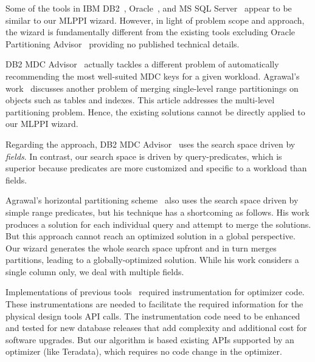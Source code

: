 \documentclass[runningheads]{comsis2}
\begin{document}
Some of the tools in IBM DB2~\cite{Lightstone04:db2auto}, 
Oracle~\cite{sheet2009oracle}, and MS SQL Server~\cite{agrawal04:integrating} 
appear to be similar to our MLPPI wizard. 
However, in light of problem scope and approach, the wizard 
is fundamentally different from the existing tools excluding Oracle Partitioning \hbox{Advisor}~\cite{sheet2009oracle} 
providing no published technical details. 

DB2 MDC Advisor~\cite{Lightstone04:db2auto} actually tackles 
a different problem of automatically recommending the most well-suited MDC 
keys for a given workload. 
Agrawal's work~\cite{agrawal04:integrating} 
discusses another problem of merging \hbox{single-level} range partitionings on objects such as tables and indexes. 
This article addresses the multi-level \hbox{partitioning} problem. 
Hence, the existing solutions cannot be directly applied to our MLPPI wizard.   

Regarding the approach, DB2 MDC Advisor~\cite{Lightstone04:db2auto} uses 
the search space driven by {\em fields}. In contrast, our search 
space is driven by query-predicates, which is superior because 
predicates are more customized and specific to a workload than fields. 

Agrawal's horizontal partitioning scheme~\cite{agrawal04:integrating} 
also uses the search space driven by simple range predicates, but 
his technique has a shortcoming as follows. 
His work produces a solution for each individual query and attempt 
to merge the solutions. But this approach cannot reach 
an optimized solution in a global perspective.
Our wizard generates the whole search space upfront and in turn merges partitions, leading to a \hbox{globally-optimized} solution. 
While his work considers a single column only, we deal with multiple fields.

Implementations of previous tools~\cite{agrawal04:integrating,Lightstone04:db2auto,nehme2011automated} \hbox{required} instrumentation for optimizer code.
These instrumentations are needed to facilitate the required 
information for the physical design tools API calls. 
The \hbox{instrumentation} code need to be enhanced and tested for new database 
releases that add complexity and additional cost for software upgrades. 
But our algorithm is based existing APIs supported by an optimizer (like Teradata), 
which requires no code change in the optimizer.
\end{document}

